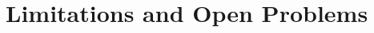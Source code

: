 \documentclass[11pt,a4paper]{article}
\begin{document}
\section{Limitations and Open Problems}
\end{document}
